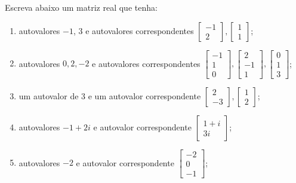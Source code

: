 \begin{question}
  Escreva abaixo um matriz real que tenha:
  \begin{enumerate}[label=\alph*)]
    \item autovalores $-1$, $3$ e autovalores correspondentes $\begin{bmatrix}-1 \\ 2\end{bmatrix}, \begin{bmatrix} 1 \\ 1\end{bmatrix}$;
    \item autovalores $0,2, -2$ e autovalores correspondentes $\begin{bmatrix}-1 \\ 1 \\ 0\end{bmatrix}, \begin{bmatrix} 2 \\ -1 \\ 1\end{bmatrix}, \begin{bmatrix} 0 \\ 1 \\ 3\end{bmatrix}$;
    \item um autovalor de  $3$ e um autovalor correspondente $\begin{bmatrix}2\\ -3 \end{bmatrix}, \begin{bmatrix} 1\\ 2\end{bmatrix}$;
    \item autovalores $-1 + 2i$ e autovalor correspondente $\begin{bmatrix}1+ i \\ 3i\end{bmatrix}$;
    \item autovalores $-2$ e autovalor correspondente $\begin{bmatrix}-2 \\ 0 \\ -1\end{bmatrix}$;
  \end{enumerate}
  \vspace{8pt}
\end{question}

\begin{resolution}

\end{resolution}

